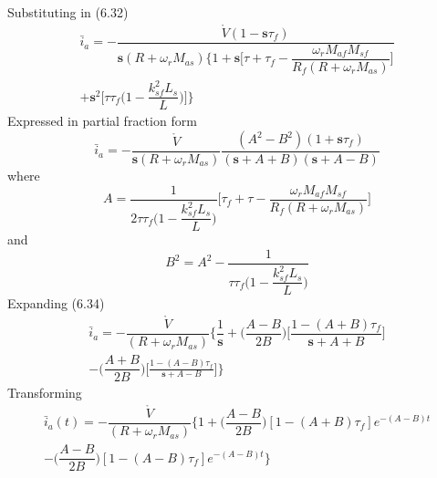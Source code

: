 \documentclass[a4paper,numbers=noenddot,12pt]{scrbook}
\begin{document}
\endgroup
\noindent Substituting in (6.32)
\begin{multline}
    \bar i_a = - \dfrac{\mathring V(1-\textbf{s}\tau_f)}{\textbf{s}(R + \omega_r M_{as}) \bigg\{1 + \textbf{s} \bigg[\tau + \tau_f - \dfrac{\omega_r M_{af} M_{sf}}{R_f (R + \omega_r M_{as})} \bigg]} \\ %
    + \textbf{s}^2 \bigg[\tau \tau_f \bigg(1 - \dfrac{k_{sf}^2 L_s}{L}\bigg)\bigg]\bigg\}
    \label{}
\end{multline}
Expressed in partial fraction form
\begin{equation}
    \bar i_a = - \dfrac{\mathring V}{\textbf{s}(R + \omega_r M_{as})} \dfrac{(A^2 - B^2)(1 + \mathbf s \tau_f)}{(\mathbf s + A + B)(\textbf{s} + A - B)} %
    \label{}
\end{equation}
where
\begin{equation}
    A = \dfrac{1}{2 \tau \tau_f \bigg(1 - \dfrac{k_{sf}^2 L_s}{L}\bigg)} \bigg[\tau_f + \tau - \dfrac{\omega_r M_{af} M_{sf}}{R_f (R + \omega_r M_{as})}\bigg]
    \label{}
\end{equation}
and
\begin{equation}
    B^2 = A^2 - \dfrac{1}{\tau \tau_f \bigg(1 - \dfrac{k_{sf}^2 L_s}{L}\bigg)}
    \label{}
\end{equation}
Expanding (6.34)
\begin{multline}
    \bar i_a = - \dfrac{\mathring V}{(R + \omega_r M_{as})}\bigg\{\dfrac{1}{\mathbf{s}} + \big(\dfrac{A-B}{2B}\bigg) \bigg[\dfrac{1 - (A + B)\tau_f}{\mathbf{s} + A + B}\bigg] \\ %
    - \bigg(\dfrac{A+B}{2B}\bigg)\bigg[\frac{1 - (A - B)\tau_f}{\mathbf{s}+A-B}\bigg]\bigg\} 
    \label{}
\end{multline}
Transforming
\begin{multline}
    \bar i_a(t) = - \dfrac{\mathring V}{(R + \omega_r M_{as})} \bigg\{1 + \bigg( \dfrac{A-B}{2B}\bigg) [1 - (A + B) \tau_f]e^{-(A-B)t} \\%
    - \bigg(\dfrac{A - B}{2B}\bigg)[1 - (A - B)\tau_f]e^{-(A - B)t}\bigg\}
    \label{}
\end{multline}
\end{document}
